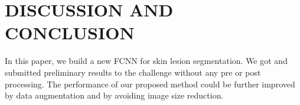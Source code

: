 \documentclass{article}
\begin{document}
\section{DISCUSSION AND CONCLUSION}
\label{sec:discussion}
In this paper, we build a new FCNN for skin lesion segmentation.  We got and submitted preliminary results to the challenge without any pre or post processing.  The performance of our proposed method could be further improved by data augmentation and by avoiding image size reduction.
%
%
\end{document}
